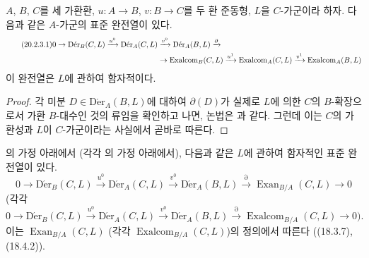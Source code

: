\begin{corollary}[20.2.3]
\label{0.20.2.3-ko}
$A$, $B$, $C$를 세 가환환, $u:A\to B$, $v:B\to C$를 두 환
준동형, $L$을 $C$-가군이라 하자. 다음과 같은 $A$-가군의 표준
완전열이 있다.
\begin{align}
\tag{20.2.3.1}
\label{0.20.2.3.1-ko}
  0\to\operatorname{D\acute{e}r}_B(C,L)\xrightarrow{u^0}
  \operatorname{D\acute{e}r}_A(C,L)&\xrightarrow{v^0}
  \operatorname{D\acute{e}r}_A(B,L)\xrightarrow{\partial} \\
  &\to\operatorname{Exalcom}_B(C,L)\xrightarrow{u^1}
  \operatorname{Exalcom}_A(C,L)\xrightarrow{v^1}
  \operatorname{Exalcom}_A(B,L) \notag
\end{align}
이 완전열은 $L$에 관하여 함자적이다.
\end{corollary}

\begin{proof}
각 미분 $D\in\operatorname{D\acute{e}r}_A(B,L)$에 대하여
$\partial(D)$가 실제로 $L$에 의한 $C$의 $B$-확장으로서 가환
$B$-대수인 것의 류임을 확인하고 나면, 논법은
과 같다. 그런데 이는 $C$의 가환성과 $L$이
$C$-가군이라는 사실에서 곧바로 따른다.
\end{proof}

\begin{corollary}[20.2.4]
\label{0.20.2.4-ko}
의 가정 아래에서 (각각
의 가정 아래에서), 다음과 같은 $L$에 관하여
함자적인 표준 완전열이 있다.
\begin{equation}
\tag{20.2.4.1}
\label{0.20.2.4.1-ko}
  0\to\operatorname{D\acute{e}r}_B(C,L)\xrightarrow{u^0}
  \operatorname{D\acute{e}r}_A(C,L)\xrightarrow{v^0}
  \operatorname{D\acute{e}r}_A(B,L)\xrightarrow{\partial}
  \operatorname{Exan}_{B/A}(C,L)\to0
\end{equation}
(각각
\begin{equation}
\tag{20.2.4.2}
\label{0.20.2.4.2-ko}
  0\to\operatorname{D\acute{e}r}_B(C,L)\xrightarrow{u^0}
  \operatorname{D\acute{e}r}_A(C,L)\xrightarrow{v^0}
  \operatorname{D\acute{e}r}_A(B,L)\xrightarrow{\partial}
  \operatorname{Exalcom}_{B/A}(C,L)\to0\text{).}
\end{equation}
이는 $\operatorname{Exan}_{B/A}(C,L)$ (각각
$\operatorname{Exalcom}_{B/A}(C,L)$)의 정의에서 따른다
((18.3.7), (18.4.2)).
\end{corollary}

